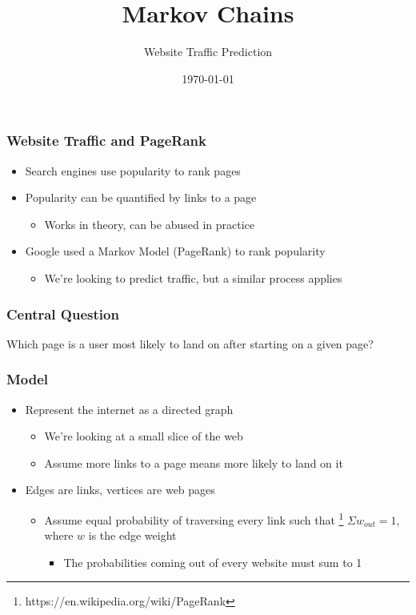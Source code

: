 \documentclass{beamer}
\title[Markov Chains]{Markov Chains}
\subtitle{Website Traffic Prediction}
\institute{Tanay Biradar}
\date{\today}
\begin{document}
\begin{frame}
  \titlepage
\end{frame}

\begin{frame}
  \frametitle{Website Traffic and PageRank}
  \begin{itemize}
    \item Search engines use popularity to rank pages
    \item Popularity can be quantified by links to a page
      \begin{itemize}
        \item Works in theory, can be abused in practice
      \end{itemize}
    \item Google used a Markov Model (PageRank) to rank popularity
      \begin{itemize}
        \item We're looking to predict traffic, but a similar process applies
      \end{itemize}
  \end{itemize}
\end{frame}

\begin{frame}
  \frametitle{Central Question}
  Which page is a user most likely to land on after starting on a given page?
\end{frame}

\begin{frame}
  \frametitle{Model}
  \begin{itemize}
    \item Represent the internet as a directed graph
        \begin{itemize}
          \item We're looking at a small slice of the web
          \item Assume more links to a page means more likely to land on it
        \end{itemize}
    \item Edges are links, vertices are web pages
        \begin{itemize}
          \item Assume equal probability of traversing every link such that
            \footnote{https://en.wikipedia.org/wiki/PageRank}
            $\Sigma w_{out} = 1$, where $w$ is the edge weight
            \begin{itemize}
              \item The probabilities coming out of every website must sum to 1
            \end{itemize}
        \end{itemize}
  \end{itemize}

\end{frame}
\end{document}

